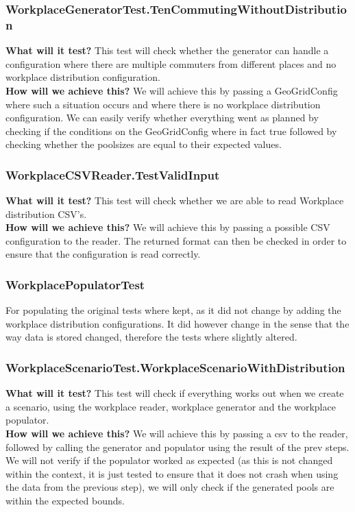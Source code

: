 \documentclass{article}
\begin{document}
\subsubsection{WorkplaceGeneratorTest.TenCommutingWithoutDistribution}
\textbf{What will it test?}
This test will check whether the generator can handle a configuration where there are multiple commuters from different places and no workplace distribution configuration.\\
\newline
\textbf{How will we achieve this?}
We will achieve this by passing a GeoGridConfig where such a situation occurs and where there is no workplace distribution configuration. We can easily verify whether everything went as planned by checking if the conditions on the GeoGridConfig where in fact true followed by checking whether the poolsizes are equal to their expected values.

\subsubsection{WorkplaceCSVReader.TestValidInput}
\textbf{What will it test?}
This test will check whether we are able to read Workplace distribution CSV's.\\
\newline
\textbf{How will we achieve this?}
We will achieve this by passing a possible CSV configuration to the reader. The returned format can then be checked in order to ensure that the configuration is read correctly.

\subsubsection{WorkplacePopulatorTest}
For populating the original tests where kept, as it did not change by adding the workplace distribution configurations. It did however change in the sense that the way data is stored changed, therefore the tests where slightly altered.

\subsubsection{WorkplaceScenarioTest.WorkplaceScenarioWithDistribution}
\textbf{What will it test?}
This test will check if everything works out when we create a scenario, using the workplace reader, workplace generator and the workplace populator.\\
\newline
\textbf{How will we achieve this?}
We will achieve this by passing a csv to the reader, followed by calling the generator and populator using the result of the prev steps. We will not verify if the populator worked as expected (as this is not changed within the context, it is just tested to ensure that it does not crash when using the data from the previous step), we will only check if the generated pools are within the expected bounds.
\end{document}
